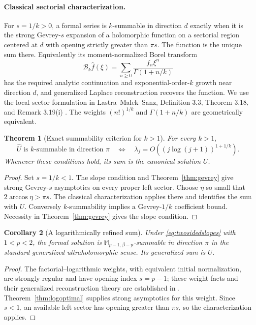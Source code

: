 \documentclass[11pt,a4paper]{article}
\numberwithin{equation}{section}
\newtheorem{theorem}{Theorem}[section]
\newtheorem{corollary}[theorem]{Corollary}
\theoremstyle{definition}\newtheorem{definition}[theorem]{Definition}
\theoremstyle{remark}\newtheorem{remark}[theorem]{Remark}
\newcommand{\Uhat}{\widehat U}\newcommand{\Qhat}{\widehat Q}\newcommand{\Vhat}{\widehat V}
\newcommand{\M}{\mathbb M}\newcommand{\CM}{\mathcal C_{\M}}
\begin{document}
\paragraph{Classical sectorial characterization.}
For $s=1/k>0$, a formal series is $k$-summable in direction $d$ exactly
when it is the strong Gevrey-$s$ expansion of a holomorphic function on a
sectorial region centered at $d$ with opening strictly greater than
$\pi s$. The function is the unique sum there. Equivalently its
moment-normalized Borel transform
\begin{equation}
 \mathcal B_k\widehat f(\xi)
 =\sum_{n\ge0}\frac{f_n\xi^n}{\Gamma(1+n/k)}
 \label{eq:kBorel}
\end{equation}
has the required analytic continuation and exponential-order-$k$ growth
near direction $d$, and generalized Laplace reconstruction recovers the
function. We use the local-sector formulation in Lastra--Malek--Sanz,
Definition 3.3, Theorem 3.18, and Remark 3.19(i) \cite{lms}. The weights
$(n!)^{1/k}$ and $\Gamma(1+n/k)$ are geometrically equivalent.

\begin{theorem}[Exact summability criterion for $k>1$]
\label{thm:ksum}
For every $k>1$,
\begin{equation}
 \boxed{\quad
 \Uhat\text{ is $k$-summable in direction }\pi
 \quad\Longleftrightarrow\quad
 \lambda_j=O((j\log(j+1))^{1+1/k}).
 \quad}
 \label{eq:ksumcriterion}
\end{equation}
Whenever these conditions hold, its sum is the canonical solution $U$.
\end{theorem}
\begin{proof}
Set $s=1/k<1$. The slope condition and Theorem~\ref{thm:gevrey} give
strong Gevrey-$s$ asymptotics on every proper left sector. Choose $\eta$
so small that $2\arccos\eta>\pi s$. The classical characterization
applies there and identifies the sum with $U$.
Conversely $k$-summability implies a Gevrey-$1/k$ coefficient bound.
Necessity in Theorem~\ref{thm:gevrey} gives the slope condition.
\end{proof}

\begin{corollary}[A logarithmically refined sum]
\label{cor:Msum}
Under \eqref{eq:twosidedslopes} with $1<p<2$, the formal solution is
$\M_{p-1,\beta-p}$-summable in direction $\pi$ in the standard
generalized ultraholomorphic sense. Its generalized sum is $U$.
\end{corollary}
\begin{proof}
The factorial--logarithmic weights, with equivalent initial normalization,
are strongly regular and have opening index $s=p-1$; these weight facts
and their generalized reconstruction theory are established in
\cite{lms,sanz}. Theorem~\ref{thm:logoptimal} supplies strong asymptotics
for this weight. Since $s<1$, an available left sector has opening
greater than $\pi s$, so the characterization applies.
\end{proof}
\end{document}

